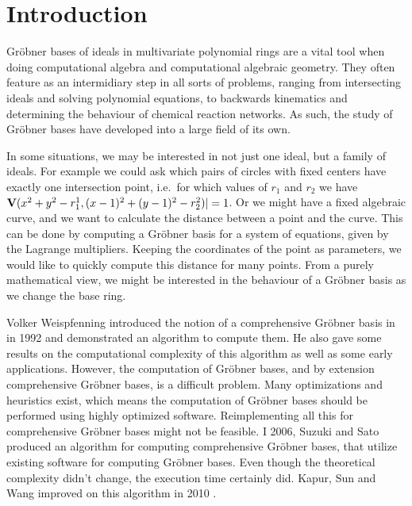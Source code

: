 \section*{Introduction}
Gröbner bases of ideals in multivariate polynomial rings are a vital tool when doing computational algebra and computational algebraic geometry. They often feature as an intermidiary step in all sorts of problems, ranging from intersecting ideals and solving polynomial equations, to backwards kinematics and determining the behaviour of chemical reaction networks\cite{IVA}. As such, the study of Gröbner bases have developed into a large field of its own.

In some situations, we may be interested in not just one ideal, but a family of ideals. For example we could ask which pairs of circles with fixed centers have exactly one intersection point, i.e.\ for which values of $r_{1}$ and $r_{2}$ we have $\operatorname{\mathbf V}(x^{2} + y^{2} - r_{1}^{1}, (x - 1)^{2} + (y - 1)^{2} - r_{2}^{2})| = 1$. Or we might have a fixed algebraic curve, and we want to calculate the distance between a point and the curve. This can be done by computing a Gröbner basis for a system of equations, given by the Lagrange multipliers. Keeping the coordinates of the point as parameters, we would like to quickly compute this distance for many points. From a purely mathematical view, we might be interested in the behaviour of a Gröbner basis as we change the base ring.

Volker Weispfenning introduced the notion of a comprehensive Gröbner basis in \cite{Weispfenning} in 1992 and demonstrated an algorithm to compute them. He also gave some results on the computational complexity of this algorithm as well as some early applications. However, the computation of Gröbner bases, and by extension comprehensive Gröbner bases, is a difficult problem. Many optimizations and heuristics exist, which means the computation of Gröbner bases should be performed using highly optimized software. Reimplementing all this for comprehensive Gröbner bases might not be feasible. I 2006, Suzuki and Sato produced an algorithm for computing comprehensive Gröbner bases, that utilize existing software for computing Gröbner bases. Even though the theoretical complexity didn't change, the execution time certainly did. Kapur, Sun and Wang improved on this algorithm in 2010 \cite{KAPUR201327}\cite{10.1145/1837934.1837946}.


